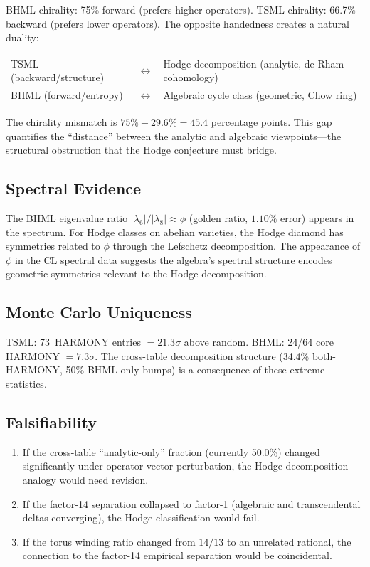 \documentclass[11pt]{article}
\theoremstyle{definition}
\begin{document}
BHML chirality: 75\% forward (prefers higher operators).  TSML
chirality: 66.7\% backward (prefers lower operators).  The opposite
handedness creates a natural duality:

\medskip
\begin{center}
\begin{tabular}{lcl}
TSML (backward/structure) & $\leftrightarrow$ &
  Hodge decomposition (analytic, de Rham cohomology) \\
BHML (forward/entropy) & $\leftrightarrow$ &
  Algebraic cycle class (geometric, Chow ring) \\
\end{tabular}
\end{center}
\medskip

\noindent
The chirality mismatch is $75\% - 29.6\% = 45.4$ percentage points.
This gap quantifies the ``distance'' between the analytic and algebraic
viewpoints---the structural obstruction that the Hodge conjecture must
bridge.

\subsection{Spectral Evidence}

The BHML eigenvalue ratio $|\lambda_6|/|\lambda_8| \approx \phi$ (golden
ratio, $1.10\%$ error) appears in the spectrum.  For Hodge classes on
abelian varieties, the Hodge diamond has symmetries related to $\phi$
through the Lefschetz decomposition.  The appearance of $\phi$ in the CL
spectral data suggests the algebra's spectral structure encodes geometric
symmetries relevant to the Hodge decomposition.

\subsection{Monte Carlo Uniqueness}

TSML: 73~HARMONY entries $= 21.3\sigma$ above random.  BHML: 24/64 core
HARMONY $= 7.3\sigma$.  The cross-table decomposition structure
(34.4\% both-HARMONY, 50\% BHML-only bumps) is a consequence of these
extreme statistics.

\subsection{Falsifiability}

\begin{enumerate}
  \item If the cross-table ``analytic-only'' fraction (currently 50.0\%)
    changed significantly under operator vector perturbation, the Hodge
    decomposition analogy would need revision.
  \item If the factor-14 separation collapsed to factor-1 (algebraic and
    transcendental deltas converging), the Hodge classification would
    fail.
  \item If the torus winding ratio changed from $14/13$ to an unrelated
    rational, the connection to the factor-14 empirical separation would
    be coincidental.
\end{enumerate}
\end{document}
